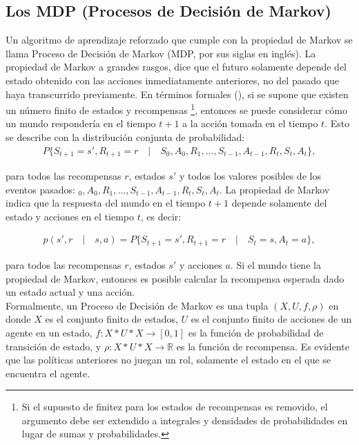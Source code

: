 \subsection{Los MDP (Procesos de Decisi\'on de Markov)}

Un algoritmo de aprendizaje reforzado que cumple con la propiedad de Markov se llama Proceso de Decisi\'on de Markov (MDP, por sus siglas en ingl\'es). La propiedad de Markov a grandes rasgos, dice que el futuro solamente depende del estado obtenido con las acciones inmediatamente anteriores, no del pasado que haya transcurrido previamente. En t\'erminos formales (\cite{Sutton}), si se supone que existen un n\'umero finito de estados y recompensas \footnote{Si el supuesto de finitez para los estados de recompensas es removido, el argumento debe ser extendido a integrales y densidades de probabilidades en lugar de sumas y probabilidades.}, entonces se puede considerar c\'omo un mundo responder\'ia en el tiempo $t+1$ a la acci\'on tomada en el tiempo $t$. Esto se describe con la distribuci\'on conjunta de probabilidad:\\

\vspace{-30pt}
\begin{align*}
P\{S_{t+1} = s', R_{t+1} = r \quad | \quad S_{0}, A_{0}, R_{1}, ... , S_{t-1}, A_{t-1}, R_{t}, S_{t}, A_{t} \},
\end{align*}

para todos las recompensas $r$, estados $s'$ y todos los valores posibles de los eventos pasados: $_{0}, A_{0}, R_{1}, ... , S_{t-1}, A_{t-1}, R_{t}, S_{t}, A_{t}$. La propiedad de Markov indica que la respuesta del mundo en el tiempo $t+1$ depende solamente del estado y acciones en el tiempo $t$, es decir:

\vspace{-30pt}
\begin{align*}
p\left(s', r \quad | \quad s,a \right) = P\{S_{t+1} = s', R_{t+1} = r \quad | \quad S_{t} = s, A_{t} =a\},
\end{align*}

para todos las recompensas $r$, estados $s'$ y acciones $a$. Si el mundo tiene la propiedad de Markov, entonces es posible calcular la recompensa esperada dado un estado actual y una acci\'on.\\

Formalmente, un Proceso de Decisi\'on de Markov es una tupla $(X,U,f,\rho)$ en donde $X$ es el conjunto finito de estados, $U$ es el conjunto finito de acciones de un agente en un estado, $f:X*U*X\rightarrow[0,1]$ es la funci\'on de probabilidad de transici\'on de estado, y $\rho:X*U*X\rightarrow\mathbb{R}$ es la funci\'on de recompensa. Es evidente que las pol\'iticas anteriores no juegan un rol, solamente el estado en el que se encuentra el agente.\\

